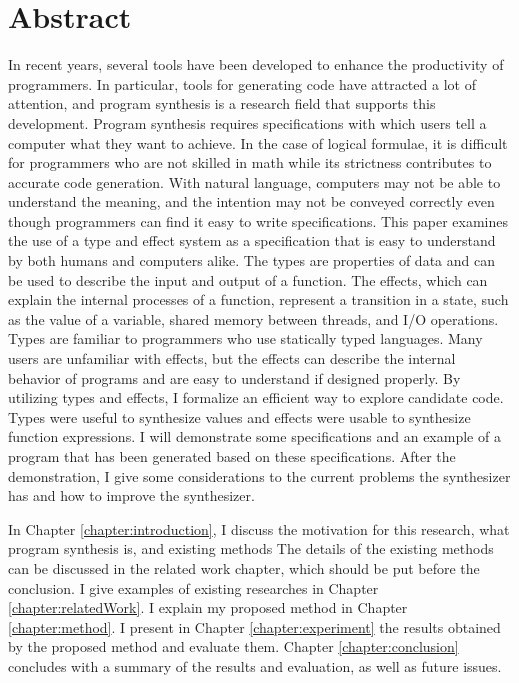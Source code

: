 \documentclass[12pt, a4paper, titlepage]{report}
\begin{document}
\chapter{Abstract} \label{chapter:abstract}
In recent years, several tools have been developed to enhance the productivity of programmers.
In particular, tools for generating code have attracted a lot of attention, and program synthesis is a research field that supports this development.
Program synthesis requires specifications with which users tell a computer what they want to achieve.
In the case of logical formulae, it is
difficult for programmers who are not skilled in math while its strictness contributes to accurate code generation.
With natural language, computers may not be able to understand the meaning, and the intention may not be conveyed correctly even though programmers can find it easy to write specifications.
This paper examines the use of a type and effect system as a specification that is easy to understand by both humans and computers alike. The types are properties of data and can be used to describe the input and output of a function. The effects, which can explain the internal processes of a function, represent a transition in a state, such as the value of a variable, shared memory between threads, and I/O operations.
Types are familiar to programmers who use statically typed languages.
Many users are unfamiliar with effects, but the effects can describe the internal behavior of programs and are easy to understand if designed properly.
By utilizing types and effects, I formalize an efficient way to explore candidate code.
Types were useful to synthesize values and effects were usable to synthesize function expressions.
I will demonstrate some specifications and an example of a program that has been generated based on these specifications.
After the demonstration, I give some considerations to the current problems the synthesizer has and how to improve the synthesizer.

In Chapter \ref{chapter:introduction}, I discuss the motivation for this research, what program synthesis is, and existing methods  The details of the existing methods can be discussed in the related work chapter, which should be  put before the conclusion.
I give examples of existing researches in Chapter \ref{chapter:relatedWork}.
I explain my proposed method in Chapter \ref{chapter:method}.
I present in Chapter \ref{chapter:experiment} the results obtained by the proposed method and evaluate them.
Chapter \ref{chapter:conclusion} concludes with a summary of the results and evaluation, as well as future issues.
\end{document}
